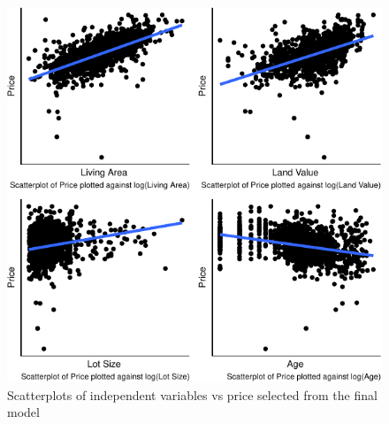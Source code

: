 \documentclass[letterpaper,8pt,twocolumn,twoside,]{pinp}
\begin{document}
\begin{figure}[h]

{\centering \includegraphics[width=0.75\linewidth]{Report_files/figure-latex/unnamed-chunk-9-1} 

}

\caption{Scatterplots of independent variables vs price selected from the final model}\label{fig:unnamed-chunk-9}
\end{figure}





\end{document}
